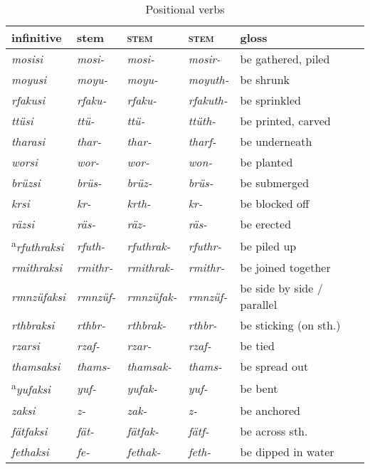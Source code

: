 \begin{table}
\caption{Positional verbs}
\label{positional.verbs}
{\small%
\begin{tabular}{lllll}
	\lsptoprule
	{infinitive} & \Pos{} {stem} & \Ext{} \textsc{stem} 	& \Rs{} \textsc{stem} 	& {gloss} \\\midrule
	\emph{mosisi} &\emph{mosi-} &\emph{mosi-} &\emph{mosir-} &be gathered, piled\\
	\emph{moyusi} &\emph{moyu-} &\emph{moyu-} &\emph{moyuth-} &be shrunk\\
	\emph{rfakusi} &\emph{rfaku-} &\emph{rfaku-} &\emph{rfakuth-} &be sprinkled\\
	\emph{ttüsi} &\emph{ttü-} &\emph{ttü-} &\emph{ttüth-} &be printed, carved\\
	\emph{tharasi} &\emph{thar-} &\emph{thar-} &\emph{tharf-} &be underneath\\
	\emph{worsi} &\emph{wor-} &\emph{wor-} &\emph{won-} &be planted\\\midrule
	\emph{brüzsi} &\emph{brüs-} &\emph{brüz-} &\emph{brüs-} &be submerged\\
	\emph{krsi} &\emph{kr-} &\emph{krth-} &\emph{kr-} &be blocked off\\
	\emph{räzsi} &\emph{räs-} &\emph{räz-} &\emph{räs-} &be erected\\
	\textsuperscript{a}\emph{rfuthraksi} &\emph{rfuth-} &\emph{rfuthrak-} &\emph{rfuthr-} &be piled up\\
	\emph{rmithraksi} &\emph{rmithr-} &\emph{rmithrak-}	&\emph{rmithr-} &be joined together\\
	\emph{rmnzüfaksi} &\emph{rmnzüf-} &\emph{rmnzüfak-}	&\emph{rmnzüf-} &be side by side / parallel\\
	\emph{rthbraksi} &\emph{rthbr-} &\emph{rthbrak-} &\emph{rthbr-} &be sticking (on sth.)\\
	\emph{rzarsi} &\emph{rzaf-} &\emph{rzar-} &\emph{rzaf-} &be tied\\
	\emph{thamsaksi} &\emph{thams-} &\emph{thamsak-} &\emph{thams-} &be spread out\\
	\textsuperscript{a}\emph{yufaksi} &\emph{yuf-} &\emph{yufak-} &\emph{yuf-} &be bent\\
	\emph{zaksi} &\emph{z-} &\emph{zak-} &\emph{z-} &be anchored\\\midrule
	\emph{fätfaksi} &\emph{fät-} &\emph{fätfak-} &\emph{fätf-} &be across sth.\\
	\emph{fethaksi} &\emph{fe-} &\emph{fethak-} &\emph{feth-} &be dipped in water\\

\end{tabular}}
\end{table}
